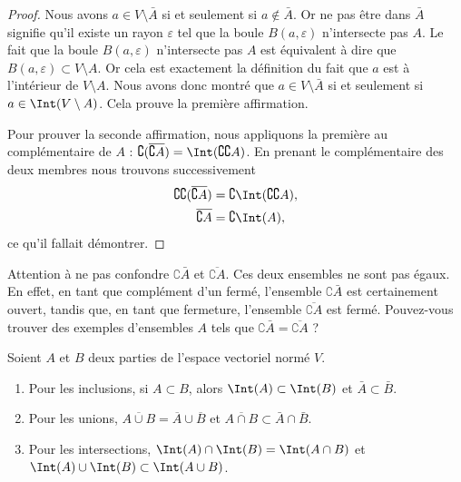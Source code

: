 \begin{proof}
	Nous avons \( a\in V\setminus\bar A\) si et seulement si \( a\notin\bar A\). Or ne pas être dans \( \bar A\) signifie qu'il existe un rayon \( \varepsilon\) tel que la boule \( B(a,\varepsilon)\) n'intersecte pas \( A\). Le fait que la boule \( B(a,\varepsilon)\) n'intersecte pas \( A\) est équivalent à dire que \( B(a,\varepsilon)\subset V\setminus A\). Or cela est exactement la définition du fait que \( a\) est à l'intérieur de \( V\setminus A\). Nous avons donc montré que \( a\in V\setminus \bar A\) si et seulement si \( a\in\Int(V\setminus A)\). Cela prouve la première affirmation.

	Pour prouver la seconde affirmation, nous appliquons la première au complémentaire de \( A\) : \( \complement(\overline{ \complement A })=\Int(\complement\complement A)\). En prenant le complémentaire des deux membres nous trouvons successivement
	\begin{equation}
		\begin{aligned}[]
			\complement\complement(\overline{ \complement A }) & =\complement\Int(\complement\complement A), \\
			\overline{ \complement A }                         & =\complement\Int(A),
		\end{aligned}
	\end{equation}
	ce qu'il fallait démontrer.
\end{proof}

Attention à ne pas confondre \( \complement \bar A\) et \( \overline{ \complement A }\). Ces deux ensembles ne sont pas égaux. En effet, en tant que complément d'un fermé, l'ensemble \( \complement \bar A\) est certainement ouvert, tandis que, en tant que fermeture, l'ensemble \( \overline{ \complement A }\) est fermé. Pouvez-vous trouver des exemples d'ensembles \( A\) tels que \( \complement \bar A=\overline{ \complement A }\) ?

\begin{proposition}     \label{PROPooRAZUooVMxPic}
	Soient \( A\) et \( B\) deux parties de l'espace vectoriel normé \( V\).
	\begin{enumerate}
		\item
		      Pour les inclusions, si \( A\subset B\), alors \( \Int(A)\subset\Int(B)\) et \( \bar A\subset\bar B\).
		\item
		      Pour les unions, \( \overline{ A\cup B }=\overline{ A }\cup\overline{ B }\) et \( \overline{ A\cap B }\subset\bar A\cap\bar B\).
		\item
		      Pour les intersections, \( \Int(A)\cap\Int(B)=\Int(A\cap B)\) et \( \Int(A)\cup\Int(B)\subset\Int(A\cup B)\).
	\end{enumerate}
\end{proposition}

